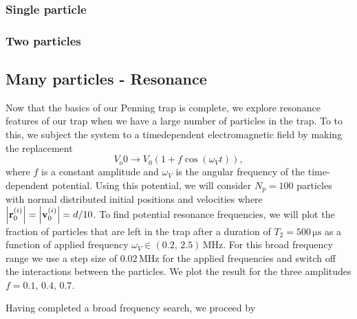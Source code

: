 \subsubsection{Single particle}

\subsubsection{Two particles}

\subsection{Many particles - Resonance}
Now that the basics of our Penning trap is complete, we explore resonance features of our trap when we have a large number of particles in the trap. To to this, we subject the system to a timedependent electromagnetic field  by making the replacement 
\begin{equation}
    V_o0 \to V_0 (1 + f \cos(\omega_V t)), \label{eq:p9_time_dep_potential}
\end{equation} 
where $f$ is a constant amplitude and $\omega_V$ is the angular frequency of the time-dependent potential. Using this potential, we will consider $N_p=100$ particles with normal distributed initial positions and velocities where $\abs{\mathbf{r}_0^{(i)}}=\abs{\mathbf{v}_0^{(i)}}=d/10$. To find potential resonance frequencies, we will plot the fraction of particles that are left in the trap after a duration of $T_2=500\,\mathrm{\mu s}$ as a function of applied frequency $\omega_V\in(0.2,\,2.5)\,\mathrm{MHz}$. For this broad frequency range we use a step size of $0.02\,\mathrm{MHz}$ for the applied frequencies and switch off the interactions between the particles. We plot the result for the three amplitudes $f=0.1,\,0.4,\,0.7$. 


Having completed a broad frequency search, we proceed by 



































